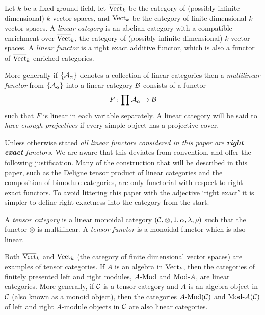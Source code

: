 \documentclass{amsart}
\begin{document}
	Let $k$ be a fixed ground field, let $\overline{\mathrm{Vect}}_k$ be the category of (possibly infinite dimensional) $k$-vector spaces, and $\mathrm{Vect}_k$ be the category of finite dimensional $k$-vector spaces.   A {\em linear category} is an abelian category with a compatible enrichment over $\overline{\mathrm{Vect}}_k$, the category of (possibly infinite dimensional) $k$-vector spaces. 
A {\em linear functor} is a right exact additive functor, which is also a functor of $\overline{\mathrm{Vect}}_k$-enriched categories. 
	
More generally if $\{\mathcal A_\alpha\}$ denotes a collection of linear categories then a {\em multilinear functor} from $\{\mathcal A_\alpha\}$ into a linear category $\mathcal B$ consists of a functor
\begin{equation*}
	F: \prod \mathcal A_\alpha \to \mathcal B
\end{equation*}
such that $F$ is linear in each variable separately. A linear category will be said to {\em have enough projectives} if every simple object has a projective cover. 

\begin{warning}
	Unless otherwise stated {\em all linear functors considered in this paper are {\bf right exact} functors}.  We are aware that this deviates from convention, and offer the following justification. Many of the construction that will be described in this paper, such as the Deligne tensor product of linear categories and the composition of bimodule categories, are only functorial with respect to right exact functors. To avoid littering this paper with the adjective `right exact' it is simpler to define right exactness into the category from the start.  
\end{warning}

\begin{definition}
	A {\em tensor category} is a linear monoidal category $(\mathcal C, \otimes, 1, \alpha, \lambda, \rho)$ such that the functor $\otimes$ is multilinear. A {\em tensor functor} is a monoidal functor which is also linear.
\end{definition}

\begin{example}
	Both $\overline{\mathrm{Vect}}_k$ and $\mathrm{Vect}_k$ (the category of finite dimensional vector spaces) are examples of tensor categories. If $A$ is an algebra in $\mathrm{Vect}_k$, then the categories of finitely presented left and right modules, $\Mod{A}{}$ and $\Mod{}{A}$, are linear categories. More generally, if $\mathcal C$ is a tensor category and $A$ is an algebra object in $\mathcal C$ (also known as a monoid object), then the categories $\Mod{A}{}(\cC)$ and $\Mod{}{A}(\cC)$ of left and right $A$-module objects in $\mathcal C$ are also linear categories.
\end{example}
\end{document}
